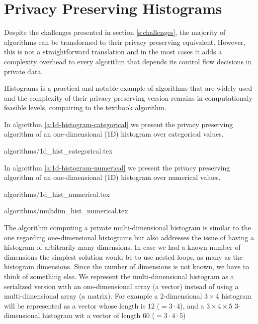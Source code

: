 \section{Privacy Preserving Histograms}\label{s:histograms}
Despite the challenges presented in section \ref{s:challenges}, the majority of algorithms can be transformed to their privacy preserving equivalent.
However, this is not a straightforward translation and in the most cases it adds a complexity overhead to every algorithm that depends its control flow decisions in private data.

Histograms is a practical and notable example of algorithms that are widely used and the complexity of their privacy preserving version remains in computationaly feasible levels, compairing to the textbook algorithm.







In algorithm \ref{a:1d-histogram-categorical} we present the privacy preserving algorithm of an one-dimensional (1D) histogram over categorical values.

{algorithms/1d_hist_categorical.tex}




In algorithm \ref{a:1d-histogram-numerical} we present the privacy preserving algorithm of an one-dimensional (1D) histogram over numerical values.

{algorithms/1d_hist_numerical.tex}



{algorithms/multdim_hist_numerical.tex}

The algorithm computing a private multi-dimensional histogram is similar to the one regarding one-dimensional histograms but also addresses the issue of having a histogram of arbitrarily many dimensions.
In case we had a known number of dimensions the simplest solution would be to use nested loops, as many as the histogram dimensions.
Since the number of dimensions is not known, we have to think of something else.
We represent the multi-dimensional histogram as a serialized version with an one-dimensional array (a vector) instead of using a multi-dimensional array (a matrix).
For example a 2-dimensional $3 \times 4$ histogram will be represented as a vector whose length is $ 12 $ ($= 3 \cdot 4$), and a $3 \times 4 \times 5$ 3-dimensional histogram wit a vector of length $ 60 $ ($= 3 \cdot 4 \cdot 5$)

